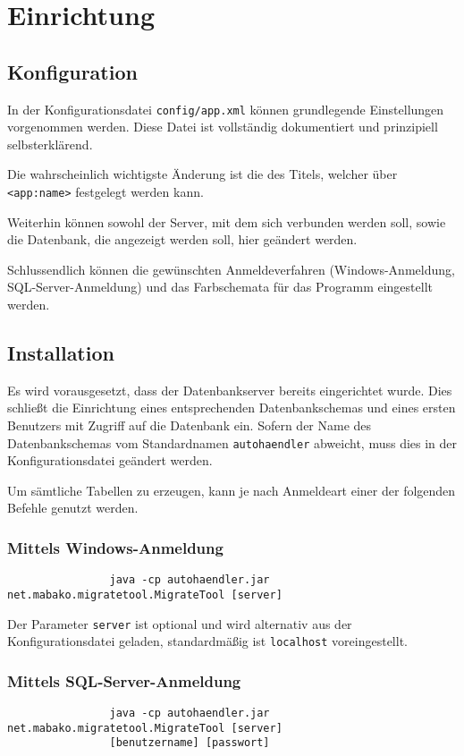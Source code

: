 \chapter{Einrichtung}
	\section{Konfiguration}\label{konfiguration}
		In der Konfigurationsdatei \texttt{config/app.xml} können grundlegende
		Einstellungen vorgenommen werden. Diese Datei ist vollständig dokumentiert und
		prinzipiell selbsterklärend.
		
		Die wahrscheinlich wichtigste Änderung ist die des Titels, welcher über
		\texttt{<app:name>} festgelegt werden kann.
		
		Weiterhin können sowohl der Server, mit dem sich verbunden werden soll, sowie
		die Datenbank, die angezeigt werden soll, hier geändert werden.
		
		Schlussendlich können die gewünschten Anmeldeverfahren (Windows-Anmeldung,
		SQL-Server-Anmeldung) und das Farbschemata für das Programm eingestellt
		werden.
	
	\section{Installation}
		Es wird vorausgesetzt, dass der Datenbankserver bereits eingerichtet wurde.
		Dies schließt die Einrichtung eines entsprechenden Datenbankschemas und eines
		ersten Benutzers mit Zugriff auf die Datenbank ein. Sofern der Name des
		Datenbankschemas vom Standardnamen \texttt{autohaendler} abweicht, muss dies
		in der Konfigurationsdatei geändert werden.
		
		Um sämtliche Tabellen zu erzeugen, kann je nach Anmeldeart einer der folgenden
		Befehle genutzt werden.
		
		\subsection*{Mittels Windows-Anmeldung}
			\begin{verbatim}
				java -cp autohaendler.jar net.mabako.migratetool.MigrateTool [server]
			\end{verbatim}
			
			Der Parameter \texttt{server} ist optional und wird alternativ aus der
			Konfigurationsdatei geladen, standardmäßig ist \texttt{localhost}
			voreingestellt.
			
		\subsection*{Mittels SQL-Server-Anmeldung}
			\begin{verbatim}
				java -cp autohaendler.jar net.mabako.migratetool.MigrateTool [server]
				[benutzername] [passwort]
			\end{verbatim}
	
